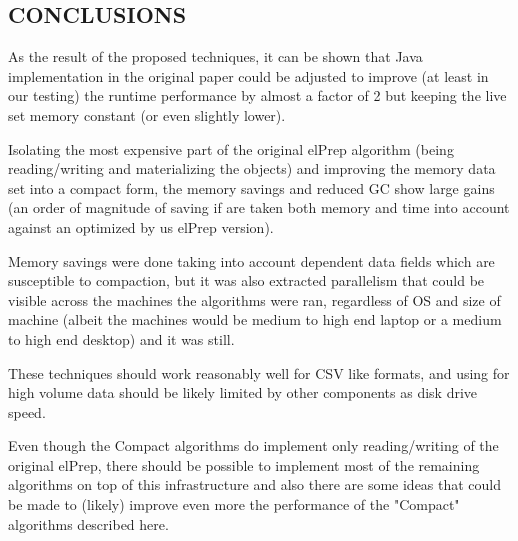 \documentclass[a4paper,twoside]{article}
\begin{document}
\subsection{\uppercase{Conclusions}}

As the result of the proposed techniques, it can be shown that Java implementation in the original paper
could be adjusted to improve (at least in our testing) the runtime performance by almost a factor of 2 but keeping the live set memory constant (or even slightly lower). 

Isolating the most expensive part of the original elPrep algorithm (being reading/writing and materializing the objects) and improving the memory data set into a compact form, the memory savings and
reduced GC show large gains (an order of magnitude of saving if are taken both memory and time into account against an optimized by us elPrep version).

Memory savings were done taking into account dependent data fields which are susceptible to compaction, but it was also extracted parallelism that could be visible across the machines the algorithms were ran,
regardless of OS and size of machine (albeit the machines would be medium to high end laptop or a medium to high end desktop) and it was still. 

These techniques should work reasonably well for CSV like formats, and using for high volume data 
should be likely limited by other components as disk drive speed.

Even though the Compact algorithms do implement only reading/writing of the original elPrep, there
should be possible to implement most of the remaining algorithms on top of this infrastructure and also there are some ideas that could be made to (likely) improve even more the performance of the "Compact" algorithms described here.
\end{document}
